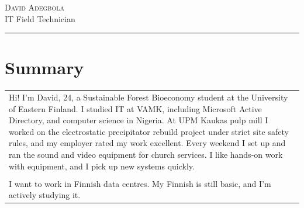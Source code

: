 \documentclass[a4paper,11pt]{article}
\begin{document}
\setlength{\cvlabelw}{3.4cm}

\begin{cvheader}
\par{\centering
		{\Huge \textsc{David Adegbola}}\\[0.4em]
		{\Large IT Field Technician}
	\bigskip\par}

\hrule
\vspace{0.5em}
\end{cvheader}

\section{Summary}
\begin{tabular}{p{}}
 Hi! I'm David, 24, a Sustainable Forest Bioeconomy student at the University of Eastern Finland. I studied IT at VAMK, including Microsoft Active Directory, and computer science in Nigeria. At UPM Kaukas pulp mill I worked on the electrostatic precipitator rebuild project under strict site safety rules, and my employer rated my work excellent. Every weekend I set up and ran the sound and video equipment for church services. I like hands-on work with equipment, and I pick up new systems quickly.\\\\

 I want to work in Finnish data centres. My Finnish is still basic, and I'm actively studying it.
\end{tabular}
\end{document}
